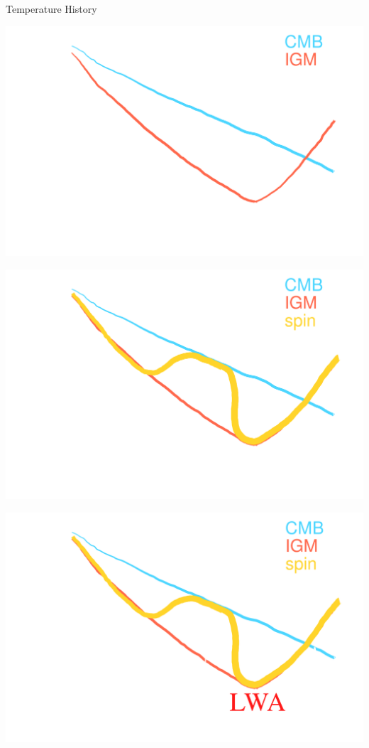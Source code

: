 \documentclass{beamer}
\begin{document}
\begin{frame}{Temperature History}
    \begin{overprint}
        \begin{center}
            \includegraphics[height=0.6\textheight]{figures/thermal-history-2}
        \end{center}
        \begin{center}
            \includegraphics[height=0.6\textheight]{figures/thermal-history-3}
        \end{center}
        \begin{center}
            \includegraphics[height=0.6\textheight]{figures/thermal-history-4}

\end{center}
\end{overprint}
\end{frame}
\end{document}

